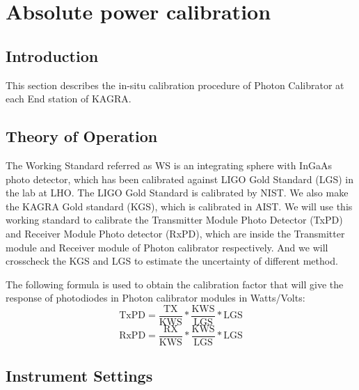 
\chapter{Absolute power calibration} %
\label{Chapter5} %
\section{Introduction}
\label{sec:intro}
This section describes the in-situ calibration procedure of Photon Calibrator at each End station of KAGRA.

\section{Theory of Operation}

The Working Standard referred as WS  is an integrating sphere with InGaAs photo detector, which has been calibrated against LIGO Gold Standard (LGS) in the lab at LHO. The LIGO Gold Standard is calibrated by NIST. We also make the KAGRA Gold standard (KGS), which is calibrated in AIST.  We will use this working standard to calibrate the Transmitter Module Photo Detector (TxPD) and Receiver Module Photo detector (RxPD), which are inside the Transmitter module and Receiver module of Photon calibrator respectively. And we will crosscheck the KGS and LGS to estimate the uncertainty of different method.

The following formula is used to obtain the calibration factor that will give the response of photodiodes in Photon calibrator modules in Watts/Volts:
\
\begin{equation}
\mathrm{TxPD} = \frac{\mathrm{TX}}{\mathrm{KWS}}*\frac{\mathrm{KWS}}{\mathrm{LGS}}*\mathrm{LGS}
\end{equation}
\begin{equation}
\mathrm{RxPD} = \frac{\mathrm{RX}}{\mathrm{KWS}}*\frac{\mathrm{KWS}}{\mathrm{LGS}}*\mathrm{LGS}
\end{equation}

\section{Instrument Settings}

